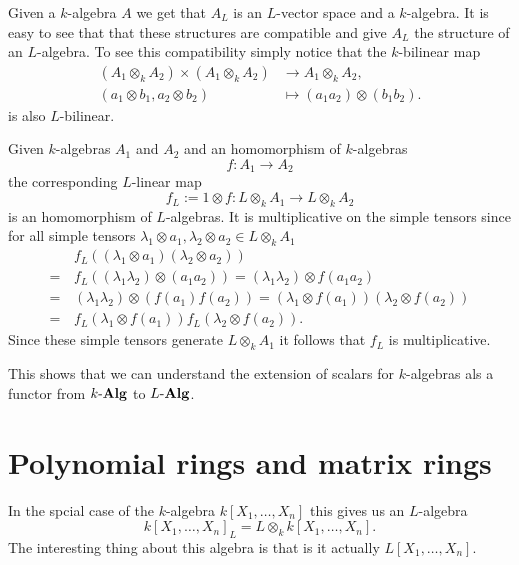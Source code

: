 Given a $k$-algebra $A$ we get that $A_L$ is an $L$-vector space and a $k$-algebra. It is easy to see that that these structures are compatible and give $A_L$ the structure of an $L$-algebra. To see this compatibility simply notice that the $k$-bilinear map
\begin{align*}
 (A_1 \otimes_k A_2) \times (A_1 \otimes_k A_2) &\to A_1 \otimes_k A_2, \\
 (a_1 \otimes b_1, a_2 \otimes b_2) &\mapsto (a_1 a_2) \otimes (b_1 b_2).
\end{align*}
is also $L$-bilinear.

Given $k$-algebras $A_1$ and $A_2$ and an homomorphism of $k$-algebras
\[
 f \colon A_1 \to A_2
\]
the corresponding $L$-linear map
\[
 f_L := 1 \otimes f \colon L \otimes_k A_1 \to L \otimes_k A_2
\]
is an homomorphism of $L$-algebras. It is multiplicative on the simple tensors since for all simple tensors $\lambda_1 \otimes a_1, \lambda_2 \otimes a_2 \in L \otimes_k A_1$
\begin{align*}
  &\, f_L((\lambda_1 \otimes a_1)(\lambda_2 \otimes a_2)) \\
 =&\, f_L((\lambda_1 \lambda_2) \otimes (a_1 a_2))
 =    (\lambda_1 \lambda_2) \otimes f(a_1 a_2) \\
 =&\, (\lambda_1 \lambda_2) \otimes (f(a_1)f(a_2))
 =    (\lambda_1 \otimes f(a_1)) (\lambda_2 \otimes f(a_2)) \\
 =&\, f_L(\lambda_1 \otimes f(a_1)) f_L(\lambda_2 \otimes f(a_2)).
\end{align*}
Since these simple tensors generate $L \otimes_k A_1$ it follows that $f_L$ is multiplicative.

This shows that we can understand the extension of scalars for $k$-algebras als a functor from $k\text{-}\mathbf{Alg}$ to $L\text{-}\mathbf{Alg}$.





\section{Polynomial rings and matrix rings}


In the spcial case of the $k$-algebra $k[X_1, \dotsc, X_n]$ this gives us an $L$-algebra
\[
 k[X_1, \dotsc, X_n]_L = L \otimes_k k[X_1, \dotsc, X_n].
\]
The interesting thing about this algebra is that is it actually $L[X_1, \dotsc, X_n]$.


